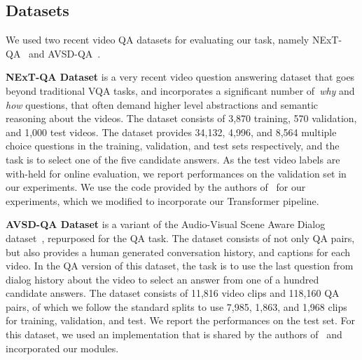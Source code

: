 \documentclass[letterpaper]{article} \usepackage{aaai22}  \usepackage{times}  \usepackage{helvet}  \usepackage{courier}  \usepackage[hyphens]{url}  \usepackage{graphicx} \urlstyle{rm} \def\UrlFont{\rm}  \usepackage{natbib}  \usepackage{caption} \DeclareCaptionStyle{ruled}{labelfont=normalfont,labelsep=colon,strut=off} \frenchspacing  \setlength{\pdfpagewidth}{8.5in}  \setlength{\pdfpageheight}{11in}  \usepackage{algorithm}
\begin{document}
\subsection{Datasets}
We used two recent video QA datasets for evaluating our task, namely NExT-QA~\cite{xiao2021next} and AVSD-QA~\cite{alamri2019audio}. 

\noindent\textbf{NExT-QA Dataset} is a very recent video question answering dataset that goes beyond traditional VQA tasks, and incorporates a significant number of~\emph{why} and \emph{how} questions, that often demand higher level abstractions and semantic reasoning about the videos. The dataset consists of 3,870 training, 570 validation, and 1,000 test videos. The dataset provides 34,132, 4,996, and 8,564 multiple choice questions in the training, validation, and test sets respectively, and the task is to select one of the five candidate answers.  As the test video labels are with-held for online evaluation, we report performances on the validation set in our experiments. We use the code provided by the authors of~\cite{xiao2021next} for our experiments, which we modified to incorporate our Transformer pipeline.

\noindent\textbf{AVSD-QA Dataset} is a variant of the Audio-Visual Scene Aware Dialog dataset~\cite{AVSD@DSTC7}, repurposed for the QA task. The dataset consists of not only QA pairs, but also provides a human generated conversation history, and  captions for each video. In the QA version of this dataset, the task is to use the last question from dialog history about the video to select an answer from one of a hundred candidate answers. The dataset consists of 11,816 video clips and 118,160 QA pairs, of which we follow the standard splits to use 7,985, 1,863, and 1,968 clips for training, validation, and test. We report the performances on the test set. For this dataset, we used an implementation that is shared by the authors of~\cite{geng2021dynamic} and incorporated our modules.
\end{document}
